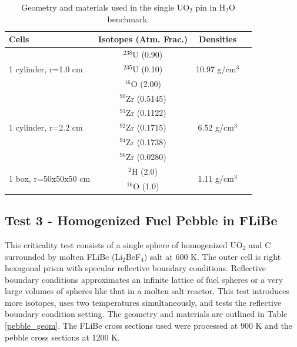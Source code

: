 \documentclass[preprint,12pt]{elsarticle}
\begin{document}
\begin{table}[h]
\centering
\caption{Geometry and materials used in the single UO$_2$ pin in H$_2$O benchmark.}
\label{uo2_pincell_geom}
\begin{tabular}{| l | c | c | c |}
\hline
Cells & Isotopes (Atm. Frac.)& Densities \\
\hline
\multirow{3}{*}{1 cylinder, r=1.0 cm }  &   $^{238}$U   (0.90) &    \multirow{3}{*}{10.97 g/cm$^3$} \\
                                       &   $^{235}$U   (0.10)& \\
                                       &   $^{16}$O    (2.00)& \\
\hline
\multirow{5}{*}{1 cylinder, r=2.2 cm }  &   $^{90}$Zr   (0.5145) &    \multirow{5}{*}{6.52 g/cm$^3$} \\
                                       &   $^{91}$Zr   (0.1122)& \\
                                       &   $^{92}$Zr   (0.1715)& \\
                                       &   $^{94}$Zr   (0.1738)& \\
                                       &   $^{96}$Zr   (0.0280)& \\
\hline
\multirow{2}{*}{1 box, r=50x50x50 cm }  &    $^{2}$H   (2.0) &    \multirow{2}{*}{1.11 g/cm$^3$} \\
                                  &   $^{16}$O   (1.0) & \\
\hline
\end{tabular}
\end{table}

\subsection{Test 3 - Homogenized Fuel Pebble in FLiBe}

This criticality test consists of a single sphere of homogenized UO$_2$ and C surrounded by molten FLiBe (Li$_2$BeF$_4$) salt at 600 K.  The outer cell is right hexagonal prism with specular reflective boundary conditions.  Reflective boundary conditions approximates an infinite lattice of fuel spheres or a very large volumes of spheres like that in a molten salt reactor. This test introduces more isotopes, uses two temperatures simultaneously, and tests the reflective boundary condition setting.  The geometry and materials are outlined in Table \ref{pebble_geom}. The FLiBe cross sections used were processed at 900 K and the pebble cross sections at 1200 K.
\end{document}
